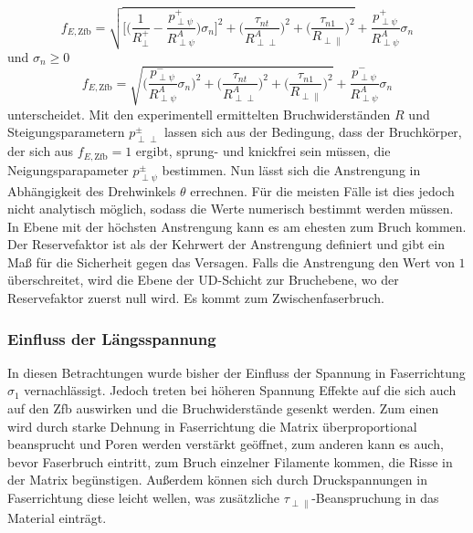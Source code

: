 \begin{equation}\label{Zfb1}
	f_{E,\mathrm{Zfb}} = \sqrt{\biggl[\biggl(\frac{1}{R_{\perp}^+}-\frac{p_{\perp\psi}^+}{R_{\perp\psi}^A}\biggl)\sigma_n\biggl]^2 + \biggl(\frac{\tau_{nt}}{R_{\perp\perp}^A}\biggr)^2 + \biggl(\frac{\tau_{n1}}{R_{\perp\parallel}}\biggr)^2} +  \frac{p_{\perp\psi}^+}{R_{\perp\psi}^A}\sigma_n
\end{equation}
und $\sigma_n \geq 0$
\begin{equation}\label{Zfb2}
	f_{E,\mathrm{Zfb}} = \sqrt{\biggl(\frac{p_{\perp\psi}^-}{R_{\perp\psi}^A}\sigma_n\biggr)^2 + \biggl(\frac{\tau_{nt}}{R_{\perp\perp}^A}\biggr)^2 + \biggl(\frac{\tau_{n1}}{R_{\perp\parallel}}\biggr)^2} +  \frac{p_{\perp\psi}^-}{R_{\perp\psi}^A}\sigma_n
\end{equation}
unterscheidet. Mit den experimentell ermittelten Bruchwiderständen $R$ und Steigungsparametern $p_{\perp\perp}^\pm$ lassen sich aus der Bedingung, dass der Bruchkörper, der sich aus $f_{E,\mathrm{Zfb}} = 1$ ergibt, sprung- und knickfrei sein müssen, die Neigungsparapameter $p_{\perp\psi}^\pm$ bestimmen. Nun lässt sich die Anstrengung in Abhängigkeit des Drehwinkels $\theta$ errechnen. Für die meisten Fälle ist dies jedoch nicht analytisch möglich, sodass die Werte numerisch bestimmt werden müssen. In Ebene mit der höchsten Anstrengung kann es am ehesten zum Bruch kommen. Der Reservefaktor ist als der Kehrwert der Anstrengung definiert und gibt ein Maß für die Sicherheit gegen das Versagen. Falls die Anstrengung den Wert von $1$ überschreitet, wird die Ebene der UD-Schicht zur Bruchebene, wo der Reservefaktor zuerst null wird. Es kommt zum Zwischenfaserbruch.
\subsubsection{Einfluss der Längsspannung}
In diesen Betrachtungen wurde bisher der Einfluss der Spannung in Faserrichtung $\sigma_1$ vernachlässigt. Jedoch treten bei höheren Spannung Effekte auf die sich auch auf den Zfb auswirken und die Bruchwiderstände gesenkt werden. Zum einen wird durch starke Dehnung in Faserrichtung die Matrix überproportional beansprucht und Poren werden verstärkt geöffnet, zum anderen kann es auch, bevor Faserbruch eintritt, zum Bruch einzelner Filamente kommen, die Risse in der Matrix begünstigen. Außerdem können sich durch Druckspannungen in Faserrichtung diese leicht wellen, was zusätzliche $\tau_{\perp\parallel}$-Beanspruchung in das Material einträgt.

